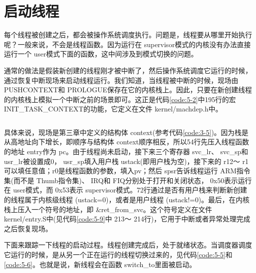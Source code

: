 \documentclass[main.tex]{subfiles}
\begin{document}
\begin{CJK*}{UTF8}{song}
\begin{code}
\label{code:5-9}
\inputminted[firstline=201,lastline=243,linenos,numbersep=5pt,frame=lines,framesep=2mm]{gas}{src/chapter05/kernel/entry.S}
\end{code}

\section{启动线程}
\label{section:start-thread}
每个线程被创建之后，都会被操作系统调度执行。问题是，线程要从哪里开始执行呢？一般来说，不会是线程函数。因为运行在 supervisor模式的内核没有办法直接运行一个 user模式下面的函数，这中间涉及到模式切换的问题。

\par
通常的做法是假装新创建的线程刚才被中断了，然后操作系统调度它运行的时候，通过恢复中断现场来启动线程运行。我们知道，当线程被中断的时候，现场由 PUSH\-CONTEXT和 PRO\-LOGUE保存在它的内核栈上。因此，只要在新创建线程的内核栈上模拟一个中断之前的场景即可。这正是代码\ref{code:5-2}中195行的宏 INIT\_\-TASK\_\-CONTEXT的功能，它定义在文件 kernel\-/\-machdep.h中。

\begin{code}
\label{code:5-10}
\inputminted[firstline=47,lastline=73,linenos,numbersep=5pt,frame=lines,framesep=2mm]{c}{src/chapter05/kernel/machdep.h}
\end{code}

具体来说，现场是第三章中定义的结构体 context(参考代码\ref{code:3-5})。因为栈是从高地址向下增长，即顺序与结构体 context顺序相反，所以54行先压入线程函数的地址 entry作为 pc。由于线程尚未启动，接下来三个寄存器 svc\_\-lr、 svc\_\-sp和 usr\_\-lr被设置成0， usr\_\-sp填入用户栈 ustack(即用户栈为空)，接下来的 r12～ r1可以填任意值；r0是线程函数的参数，填入pv；然后 spsr告诉线程运行 ARM指令集(而不是 Thumb指令集)、 IRQ和 FIQ分别处于打开和关闭状态， 0x50表示运行在 user模式，而 0x53表示  supervisor模式。72行通过是否有用户栈来判断新创建的线程属于内核级线程 (ustack=0)，或者是用户线程 (ustack!=0)。最后，在内核栈上压入一个符号的地址，即  \&ret\_\-from\_\-svc。这个符号定义在文件  kernel\-/\-entry.S中(见代码\ref{code:5-9}中 213～ 214行)，它用于中断或者异常处理完成之后恢复现场。

\par
下面来跟踪一下线程的启动过程。线程创建完成后，处于就绪状态。当调度器调度它运行的时候，是从另一个正在运行的线程切换过来的，见代码\ref{code:5-5}和\ref{code:5-6}。也就是说，新线程会在函数 switch\_\-to里面被启动。


\end{CJK*}
\end{document}
